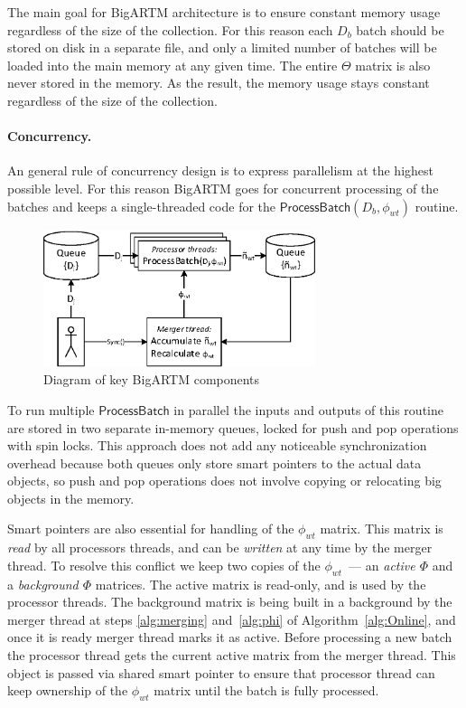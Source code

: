 \documentclass[russian]{llncs}
\newcommand{\kw}[1]{\textsf{#1}}
\begin{document}
The main goal for BigARTM architecture is to ensure constant memory usage regardless of the size of the collection.
For this reason each $D_b$ batch should be stored on disk in a separate file,
and only a limited number of batches will be loaded into the main memory at any given time.
The entire $\Theta$ matrix is also never stored in the memory.
As the result, the memory usage stays constant regardless of the size of the collection.

\paragraph{Concurrency.}
An general rule of concurrency design is to express parallelism at the highest possible level.
For this reason BigARTM goes for concurrent processing of the batches
and keeps a single-threaded code for the $\kw{ProcessBatch}(D_b, \phi_{wt})$ routine.

\begin{figure}[h!]
\begin{centering}
\includegraphics[height=40mm]{diagramm_artm_core.eps}
\caption{Diagram of key BigARTM components}
\label{fig:diagramm_artm_core}
\end{centering}
\end{figure}

To run multiple $\kw{ProcessBatch}$ in parallel the inputs and outputs of this routine are stored in two separate in-memory queues,
locked for push and pop operations with spin locks.
This approach does not add any noticeable synchronization overhead because
both queues only store smart pointers to the actual data objects,
so push and pop operations does not involve copying or relocating big objects in the memory.

Smart pointers are also essential for handling of the $\phi_{wt}$ matrix.
This matrix is \emph{read} by all processors threads, and can be \emph{written} at any time by the merger thread.
To resolve this conflict we keep two copies of the $\phi_{wt}$~--- an \emph{active $\Phi$} and a \emph{background $\Phi$} matrices.
The active matrix is read-only, and is used by the processor threads.
The background matrix is being built in a background by the merger thread
at steps \ref{alg:merging} and~\ref{alg:phi} of Algorithm~\ref{alg:Online},
and once it is ready merger thread marks it as active.
Before processing a new batch the processor thread gets the current active matrix from the merger thread.
This object is passed via shared smart pointer to ensure that processor thread can keep ownership of the $\phi_{wt}$ matrix
until the batch is fully processed.
\end{document}
